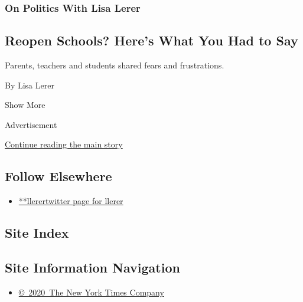 \begin{enumerate}
  \hypertarget{on-politics-with-lisa-lerer-6}{%
  \subsubsection{On Politics With Lisa
  Lerer}\label{on-politics-with-lisa-lerer-6}}

  \hypertarget{reopen-schools-heres-what-you-had-to-say}{%
  \subsection{Reopen Schools? Here's What You Had to
  Say}\label{reopen-schools-heres-what-you-had-to-say}}

  Parents, teachers and students shared fears and frustrations.

  By Lisa Lerer
\end{enumerate}

Show More

Advertisement

\protect\hyperlink{after-mid2}{Continue reading the main story}

\hypertarget{follow-elsewhere}{%
\subsection{Follow Elsewhere}\label{follow-elsewhere}}

\begin{itemize}
\tightlist
\item
  \href{https://twitter.com/llerer}{**llerertwitter page for llerer}
\end{itemize}

\hypertarget{site-index}{%
\subsection{Site Index}\label{site-index}}

\hypertarget{site-information-navigation}{%
\subsection{Site Information
Navigation}\label{site-information-navigation}}

\begin{itemize}
\tightlist
\item
  \href{https://help.nytimes3xbfgragh.onion/hc/en-us/articles/115014792127-Copyright-notice}{©~2020~The
  New York Times Company}
\end{itemize}

